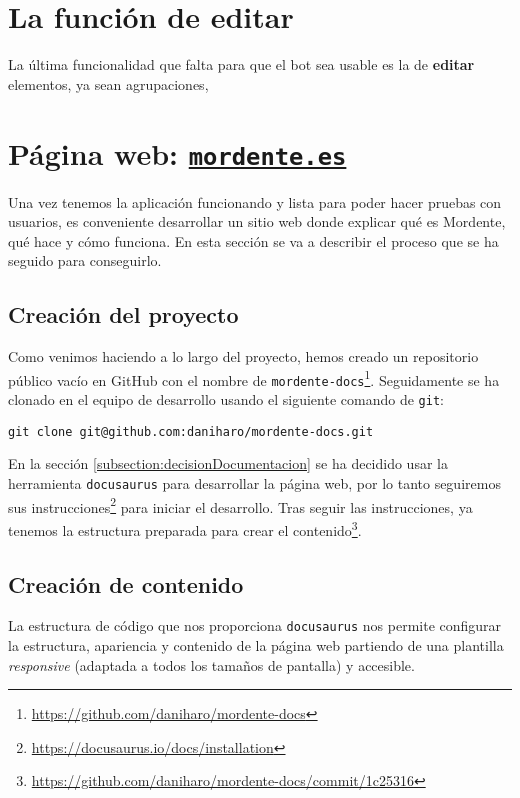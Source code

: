 \section{La función de editar}

La última funcionalidad que falta para que el bot sea usable es la de \textbf{editar} elementos, ya sean agrupaciones, 


\section{Página web: \href{https://mordente.es}{\texttt{mordente.es}}}

Una vez tenemos la aplicación funcionando y lista para poder hacer pruebas con usuarios, es conveniente desarrollar un sitio web donde explicar qué es Mordente, qué hace y cómo funciona. En esta sección se va a describir el proceso que se ha seguido para conseguirlo.

\subsection{Creación del proyecto}

Como venimos haciendo a lo largo del proyecto, hemos creado un repositorio público vacío en GitHub con el nombre de \texttt{mordente-docs}\footnote{\url{https://github.com/daniharo/mordente-docs}}. Seguidamente se ha clonado en el equipo de desarrollo usando el siguiente comando de \texttt{git}:

\begin{verbatim}
git clone git@github.com:daniharo/mordente-docs.git
\end{verbatim}

En la sección \ref{subsection:decisionDocumentacion} se ha decidido usar la herramienta \texttt{docusaurus} para desarrollar la página web, por lo tanto seguiremos sus instrucciones\footnote{\url{https://docusaurus.io/docs/installation}} para iniciar el desarrollo. Tras seguir las instrucciones, ya tenemos la estructura preparada para crear el contenido\footnote{\url{https://github.com/daniharo/mordente-docs/commit/1c25316}}.

\subsection{Creación de contenido}

La estructura de código que nos proporciona \texttt{docusaurus} nos permite configurar la estructura, apariencia y contenido de la página web partiendo de una plantilla \textit{responsive} (adaptada a todos los tamaños de pantalla) y accesible.

